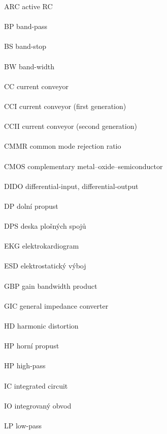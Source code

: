\vspace*{0.5cm}
ARC \hfill active RC \\ \\
BP \hfill band-pass \\ \\
BS \hfill band-stop \\ \\
BW \hfill band-width \\ \\
CC \hfill current conveyor \\ \\
CCI \hfill current conveyor (first generation) \\ \\
CCII \hfill current conveyor (second generation) \\ \\
CMMR \hfill common mode rejection ratio \\ \\
CMOS \hfill complementary metal–oxide–semiconductor \\ \\
DIDO \hfill differential-input, differential-output \\ \\
DP \hfill dolní propust \\ \\
DPS \hfill deska plošných spojů \\ \\
EKG \hfill elektrokardiogram \\ \\
ESD \hfill elektrostatický výboj \\ \\
GBP \hfill gain bandwidth product \\ \\
GIC \hfill general impedance converter \\ \\
HD \hfill harmonic distortion \\ \\
HP \hfill horní propust \\ \\
HP \hfill high-pass \\ \\
IC \hfill integrated circuit \\ \\
IO \hfill integrovaný obvod \\ \\
LP \hfill low-pass \\ \\
